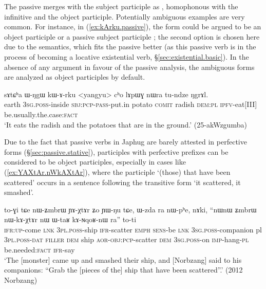 The passive  merges with the subject participle as , homophonous with the infinitive and the object participle. Potentially ambiguous examples are very common. For instance, in (\ref{ex:kArku.passive}), the form  could be argued to be an object participle  or a passive subject participle ; the second option is chosen here due to the semantics, which fits the passive  better (as this passive verb is in the process of becoming a locative existential verb, §\ref{sec:existential.basic}). In the absence of any argument in favour of the passive analysis, the ambiguous  forms are analyzed as object participles by default.

\begin{exe}
\ex \label{ex:kArku.passive}
 \gll  sɤtɕʰa ɯ-ŋgɯ kɯ-ɤ-rku <yangyu> cʰo lɤpɯɣ nɯra tu-ndze ŋgrɤl. \\
 earth \textsc{3sg}.\textsc{poss}-inside \textsc{sbj}:\textsc{pcp}-\textsc{pass}-put.in potato \textsc{comit} radish \textsc{dem}:\textsc{pl} \textsc{ipfv}-eat[III] be.usually.the.case:\textsc{fact} \\
 \glt `It eats the radish and the potatoes that are in the ground.' (25-akWzgumba)
\end{exe}

Due to the fact that passive verbs in Japhug are barely attested in perfective forms (§\ref{sec:passive.stative}), participles with perfective prefixes can be considered to be object participles, especially in cases like (\ref{ex:YAXtAr.nWkAXtAr}), where the participle   `(those) that have been scattered' occurs in a sentence following the transitive form  `it scattered, it smashed'.

\begin{exe}
\ex \label{ex:YAXtAr.nWkAXtAr}
 \gll    to-ɣi tɕe nɯ-ʑmbrɯ ɲɤ-χtɤr ʑo ɲɯ-ŋu tɕe, ɯ-zda ra nɯ-pʰe, nɤki,  ``nɯnɯ ʑmbrɯ nɯ-kɤ-χtɤr nɯ ɯ-taʁ kɤ-ɴqoʁ-nɯ ra'' to-ti\\
 \textsc{ifr}:\textsc{up}-come \textsc{lnk} \textsc{3pl}.\textsc{poss}-ship \textsc{ifr}-scatter \textsc{emph} \textsc{sens}-be \textsc{lnk} \textsc{3sg}.\textsc{poss}-companion pl \textsc{3pl}.\textsc{poss}-\textsc{dat} \textsc{filler} \textsc{dem} ship \textsc{aor}-\textsc{obj}:\textsc{pcp}-scatter \textsc{dem} \textsc{3sg}.\textsc{poss}-on \textsc{imp}-hang-\textsc{pl} be.needed:\textsc{fact} \textsc{ifr}-say\\
 \glt `The [monster] came up and smashed their ship, and [Norbzang] said to his companions: ``Grab the [pieces of the] ship that have been scattered''.' (2012 Norbzang)
\end{exe}

